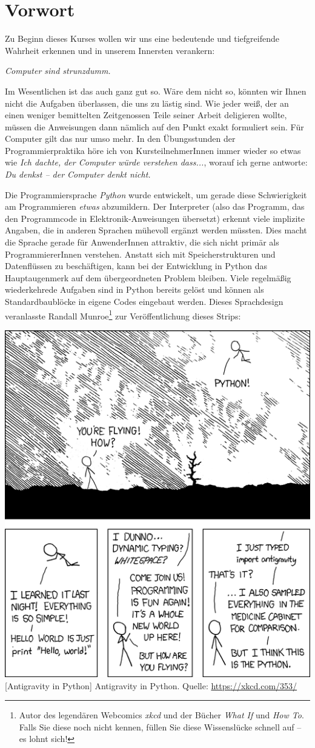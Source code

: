 \chapter*{Vorwort}
Zu Beginn dieses Kurses wollen wir uns eine bedeutende und tiefgreifende Wahrheit erkennen und in unserem Innersten verankern:

\begin{center}
\begin{Huge}
	\emph{Computer sind strunzdumm.}
\end{Huge}
\end{center}

Im Wesentlichen ist das auch ganz gut so. Wäre dem nicht so, könnten wir Ihnen nicht die Aufgaben überlassen, die uns zu lästig sind. Wie jeder weiß, der an einen weniger bemittelten Zeitgenossen Teile seiner Arbeit deligieren wollte, müssen die Anweisungen dann nämlich auf den Punkt exakt formuliert sein. Für Computer gilt das nur umso mehr. In den Übungsstunden der Programmierpraktika höre ich von KursteilnehmerInnen immer wieder so etwas wie \emph{Ich dachte, der Computer würde verstehen dass...}, worauf ich gerne antworte: \emph{Du denkst -- der Computer denkt nicht.}

Die Programmiersprache \emph{Python} wurde entwickelt, um gerade diese Schwierigkeit am Programmieren \emph{etwas} abzumildern. Der Interpreter (also das Programm, das den Programmcode in Elektronik-Anweisungen übersetzt) erkennt viele implizite Angaben, die in anderen Sprachen mühevoll ergänzt werden müssten. Dies macht die Sprache gerade für AnwenderInnen attraktiv, die sich nicht primär als Programmierer\-Innen verstehen. Anstatt sich mit Speicherstrukturen und Datenflüssen zu beschäftigen, kann bei der Entwicklung in Python das Hauptaugenmerk auf dem übergeordneten Problem bleiben. Viele regelmäßig wiederkehrede Aufgaben sind in Python bereits gelöst und können als Standardbaublöcke in eigene Codes eingebaut werden. Dieses Sprachdesign veranlasste Randall Munroe\footnote{Autor des legendären Webcomics \emph{xkcd} und der Bücher \emph{What If} und \emph{How To}. Falls Sie diese noch nicht kennen, füllen Sie diese Wissenslücke schnell auf -- es lohnt sich!} zur Veröffentlichung dieses Strips:

\begin{center}
\includegraphics[width=.4\linewidth]{./gfx/xkcd-python}
	[Antigravity in Python]
	{Antigravity in Python. Quelle: \url{https://xkcd.com/353/}}
\end{center}

